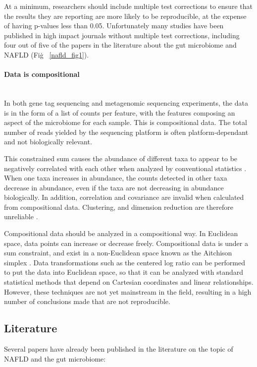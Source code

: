 At a minimum, researchers should include multiple test corrections to ensure that the results they are reporting are more likely to be reproducible, at the expense of having p-values less than 0.05. Unfortunately many studies have been published in high impact journals without multiple test corrections, including four out of five of the papers in the literature about the gut microbiome and NAFLD (Fig\. ~\ref{nafld_fig1}).

\paragraph{Data is compositional}\mbox{}\\
In both gene tag sequencing and metagenomic sequencing experiments, the data is in the form of a list of counts per feature, with the features composing an aspect of the microbiome for each sample. This is compositional data. The total number of reads yielded by the sequencing platform is often platform-dependant and not biologically relevant.

This constrained sum causes the abundance of different taxa to appear to be negatively correlated with each other when analyzed by conventional statistics \cite{gloor2016s}. When one taxa increases in abundance, the counts detected in other taxa decrease in abundance, even if the taxa are not decreasing in abundance biologically. In addition, correlation and covariance are invalid when calculated from compositional data. Clustering, and dimension reduction are therefore unreliable \cite{lovell2015proportionality}.

Compositional data should be analyzed in a compositional way. In Euclidean space, data points can increase or decrease freely. Compositional data is under a sum constraint, and exist in a non-Euclidean space known as the Aitchison simplex \cite{aitchison1982statistical}. Data transformations such as the centered log ratio can be performed to put the data into Euclidean space, so that it can be analyzed with standard statistical methods that depend on Cartesian coordinates and linear relationships. However, these techniques are not yet mainstream in the field, resulting in a high number of conclusions made that are not reproducible.

\subsection{Literature}
Several papers have already been published in the literature on the topic of NAFLD and the gut microbiome:

